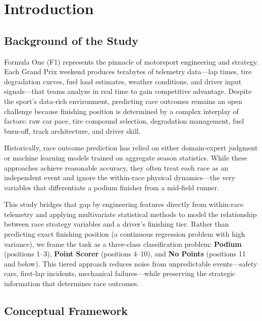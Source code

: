 \section{Introduction}

\subsection{Background of the Study}

Formula One (F1) represents the pinnacle of motorsport engineering and strategy.
Each Grand Prix weekend produces terabytes of telemetry data---lap times, tire
degradation curves, fuel load estimates, weather conditions, and driver input
signals---that teams analyze in real time to gain competitive advantage. Despite
the sport's data-rich environment, predicting race outcomes remains an open
challenge because finishing position is determined by a complex interplay of
factors: raw car pace, tire compound selection, degradation management, fuel
burn-off, track architecture, and driver skill.

Historically, race outcome prediction has relied on either domain-expert
judgment or machine learning models trained on aggregate season statistics.
While these approaches achieve reasonable accuracy, they often treat each race
as an independent event and ignore the within-race physical dynamics---the
very variables that differentiate a podium finisher from a mid-field runner.

This study bridges that gap by engineering features directly from within-race
telemetry and applying multivariate statistical methods to model the
relationship between race strategy variables and a driver's finishing tier.
Rather than predicting exact finishing position (a continuous regression
problem with high variance), we frame the task as a three-class classification
problem: \textbf{Podium} (positions 1--3), \textbf{Point Scorer} (positions
4--10), and \textbf{No Points} (positions 11 and below). This tiered approach
reduces noise from unpredictable events---safety cars, first-lap incidents,
mechanical failures---while preserving the strategic information that
determines race outcomes.

\subsection{Conceptual Framework}

